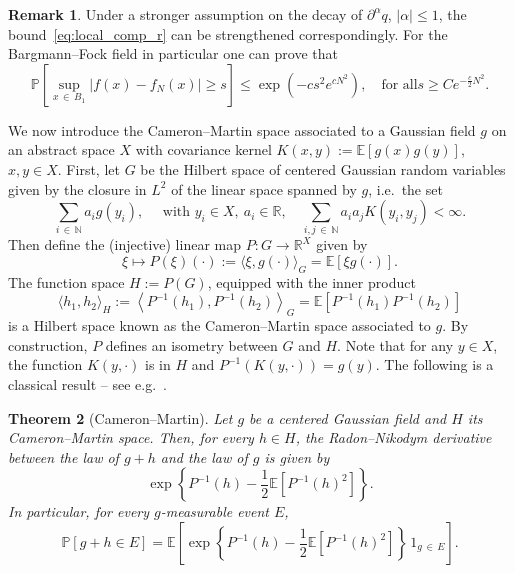 \documentclass[10pt]{amsart}
\newtheorem{theo}{Theorem}[section]
\theoremstyle{definition}\newtheorem{defi}[theo]{Definition}\newtheorem{rema}[theo]{Remark}\newtheorem{exam}[theo]{Example}\newtheorem{exem}[theo]{Example}\newtheorem{nota}[theo]{Notation}
\renewcommand{\P}{\mathbb{P}}
\newcommand{\E}{\mathbb{E}}
\newcommand{\R}{\mathbb{R}}
\newcommand{\N}{\mathbb{N}}
\begin{document}
\begin{rema}
Under a stronger assumption on the decay of $\partial^\alpha q$, $|\alpha|\leq1$, the bound~\eqref{eq:local_comp_r} can be strengthened correspondingly. For the Bargmann--Fock field in particular one can prove that
\begin{equation}\label{eq:local_comp_r2}
\P\left[\sup_{x\,\in\,B_1}\left|f(x)-f_N(x)\right| \geq s \right] \leq \exp\left(-cs^2 e^{cN^2}\right), \quad\text{for all} s\geq Ce^{-\frac{c}{2}N^2}.
\end{equation}
\end{rema}

We now introduce the Cameron--Martin space associated to a Gaussian field $g$ on an abstract space $X$ with covariance kernel $K(x,y):=\E[g(x)g(y)]$, $x,y\in X$. First, let $G$ be the Hilbert space of centered Gaussian random variables given by the closure in $L^2$ of the linear space spanned by $g$, i.e.~the set
\begin{equation}
\sum_{i\,\in\,\N}a_i g(y_i),\quad\text{ with } y_i\in X,~a_i\in \R,\quad\sum_{i,j\,\in\,\N}a_i a_j K(y_i,y_j)<\infty.
\end{equation}
Then define the (injective) linear map $P: G\to \R^X$ given by
\begin{equation}
\xi \mapsto P(\xi)(\cdot):=\langle\xi,g(\cdot)\rangle_G=\E[\xi g(\cdot)].
\end{equation}
The function space $H:=P(G)$, equipped with the inner product
\begin{equation}
\langle h_1,h_2\rangle_H:=\left\langle P^{-1}(h_1),P^{-1}(h_2)\right\rangle_G=\E\left[P^{-1}(h_1)P^{-1}(h_2)\right]
\end{equation}
is a Hilbert space known as the Cameron--Martin space associated to $g$. By construction, $P$ defines an isometry between $G$ and $H$. Note that for any $y\in X$, the function $K(y,\cdot)$ is in $H$ and $P^{-1}(K(y,\cdot))=g(y)$. The following is a classical result -- see e.g.~\cite[Theorems~14.1 and~3.33]{janson_1997}.

\begin{theo}[Cameron--Martin]\label{thm:Cameron-Martin}
Let $g$ be a centered Gaussian field and $H$ its Cameron--Martin space. Then, for every $h\in H$, the Radon--Nikodym derivative between the law of $g+h$ and the law of $g$ is given by
\begin{equation}
\exp\left\{P^{-1}(h) - \frac{1}{2}\E\left[P^{-1}(h)^2\right]\right\}.
\end{equation}
In particular, for every $g$-measurable event $E$,
\begin{equation}
\P\left[g+h\in E\right]=\E\left[\exp\left\{P^{-1}(h) - \frac{1}{2}\E\left[P^{-1}(h)^2\right]\right\} \,1_{g\,\in\,E}\right].
\end{equation}
\end{theo}
\end{document}
